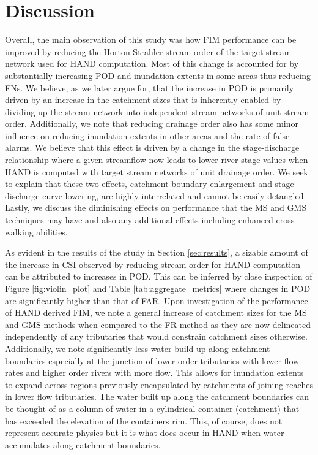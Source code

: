 \section{Discussion}
\label{sec:discussion}
%
Overall, the main observation of this study was how FIM performance can be improved by reducing the Horton-Strahler stream order of the target stream network used for HAND computation.
Most of this change is accounted for by substantially increasing POD and inundation extents in some areas thus reducing FNs.
We believe, as we later argue for, that the increase in POD is primarily driven by an increase in the catchment sizes that is inherently enabled by dividing up the stream network into independent stream networks of unit stream order.
Additionally, we note that reducing drainage order also has some minor influence on reducing inundation extents in other areas and the rate of false alarms.
We believe that this effect is driven by a change in the stage-discharge relationship where a given streamflow now leads to lower river stage values when HAND is computed with target stream networks of unit drainage order.
We seek to explain that these two effects, catchment boundary enlargement and stage-discharge curve lowering, are highly interrelated and cannot be easily detangled.
Lastly, we discuss the diminishing effects on performance that the MS and GMS techniques may have and also any additional effects including enhanced cross-walking abilities.

As evident in the results of the study in Section \ref{sec:results}, a sizable amount of the increase in CSI observed by reducing stream order for HAND computation can be attributed to increases in POD.
This can be inferred by close inspection of Figure \ref{fig:violin_plot} and Table \ref{tab:aggregate_metrics} where changes in POD are significantly higher than that of FAR.
Upon investigation of the performance of HAND derived FIM, we note a general increase of catchment sizes for the MS and GMS methods when compared to the FR method as they are now delineated independently of any tributaries that would constrain catchment sizes otherwise.
Additionally, we note significantly less water build up along catchment boundaries especially at the junction of lower order tributaries with lower flow rates and higher order rivers with more flow.
This allows for inundation extents to expand across regions previously encapsulated by catchments of joining reaches in lower flow tributaries.
The water built up along the catchment boundaries can be thought of as a column of water in a cylindrical container (catchment) that has exceeded the elevation of the containers rim.
This, of course, does not represent accurate physics but it is what does occur in HAND when water accumulates along catchment boundaries.

